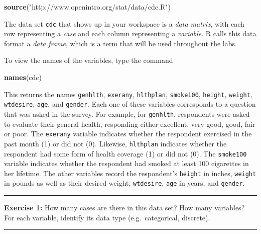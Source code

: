 \documentclass[]{book}
\newenvironment{Shaded}{\begin{snugshade}}{\end{snugshade}}
\newcommand{\KeywordTok}[1]{\textcolor[rgb]{0.13,0.29,0.53}{\textbf{{#1}}}}
\newcommand{\StringTok}[1]{\textcolor[rgb]{0.31,0.60,0.02}{{#1}}}
\newcommand{\NormalTok}[1]{{#1}}
\theoremstyle{definition}
\theoremstyle{definition}
\theoremstyle{definition}
\theoremstyle{remark}
\begin{document}
\begin{Shaded}
\begin{Highlighting}[]
\KeywordTok{source}\NormalTok{(}\StringTok{"http://www.openintro.org/stat/data/cdc.R"}\NormalTok{)}
\end{Highlighting}
\end{Shaded}

The data set \texttt{cdc} that shows up in your workspace is a
\emph{data matrix}, with each row representing a \emph{case} and each
column representing a \emph{variable}. R calls this data format a
\emph{data frame}, which is a term that will be used throughout the
labs.

To view the names of the variables, type the command

\begin{Shaded}
\begin{Highlighting}[]
\KeywordTok{names}\NormalTok{(cdc)}
\end{Highlighting}
\end{Shaded}

This returns the names \texttt{genhlth}, \texttt{exerany},
\texttt{hlthplan}, \texttt{smoke100}, \texttt{height}, \texttt{weight},
\texttt{wtdesire}, \texttt{age}, and \texttt{gender}. Each one of these
variables corresponds to a question that was asked in the survey. For
example, for \texttt{genhlth}, respondents were asked to evaluate their
general health, responding either excellent, very good, good, fair or
poor. The \texttt{exerany} variable indicates whether the respondent
exercised in the past month (1) or did not (0). Likewise,
\texttt{hlthplan} indicates whether the respondent had some form of
health coverage (1) or did not (0). The \texttt{smoke100} variable
indicates whether the respondent had smoked at least 100 cigarettes in
her lifetime. The other variables record the respondent's
\texttt{height} in inches, \texttt{weight} in pounds as well as their
desired weight, \texttt{wtdesire}, \texttt{age} in years, and
\texttt{gender}.

\begin{center}\rule{0.5\linewidth}{\linethickness}\end{center}

\textbf{Exercise 1:} How many cases are there in this data set? How many
variables? For each variable, identify its data type (e.g.~categorical,
discrete).

\begin{center}\rule{0.5\linewidth}{\linethickness}\end{center}
\end{document}
